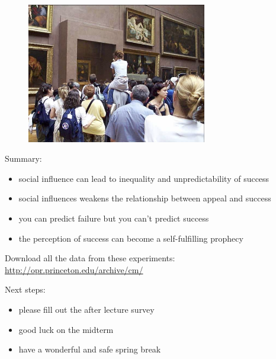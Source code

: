 \documentclass[aspectratio=169]{beamer}
\begin{document}
\begin{frame}

\begin{figure}
  \centering
  \includegraphics[width=0.7\textwidth]{figures/monalisa_onshoulders_cut3}
\end{figure}

\end{frame}
\begin{frame}

Summary:
\begin{itemize}
\item social influence can lead to inequality and unpredictability of success
\pause
\item social influences weakens the relationship between appeal and success
\pause
\item you can predict failure but you can't predict success
\pause
\item the perception of success can become a self-fulfilling prophecy
\pause
\end{itemize}

Download all the data from these experiments: \url{http://opr.princeton.edu/archive/cm/}

\end{frame}
\begin{frame}

Next steps:
\begin{itemize}
\item please fill out the after lecture survey
\pause
\item good luck on the midterm
\pause
\item have a wonderful and safe spring break
\end{itemize}

\end{frame}
\end{document}
